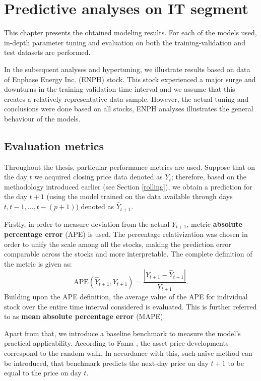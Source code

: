 \chapter{Predictive analyses on IT segment}
\label{chap:3}

This chapter presents the obtained modeling results. For each of the models used, in-depth parameter tuning and evaluation 
on both the training-validation and test datasets are performed. 

In the subsequent analyses and hypertuning, we illustrate results based on data of Enphase Energy Inc. (ENPH) stock. This stock experienced a major surge and downturns in the training-validation time interval
and we assume that this creates a relatively representative data sample. However, the actual tuning and conclusions were done based on all stocks, ENPH analyses illustrates the general behaviour of the models. 

\section{Evaluation metrics} 

Throughout the thesis, particular performance metrics are used. Suppose that on the day $t$
we acquired closing price data denoted as $Y_t$; therefore, based on the methodology introduced earlier (see Section \ref{rolling}),
we obtain a prediction for the day $t+1$ (using the model trained on the data available through days $t, t-1, \ldots, t-(p+1)$) denoted as $\hat{Y}_{t+1}$.

Firstly, in order to measure deviation from the actual $Y_{t+1}$, metric \textbf{absolute percentage error} (APE) is used.
The percentage relativization was chosen in order to unify the scale among all the stocks, making the prediction error comparable
across the stocks and more interpretable. The complete definition of the metric is given as:
\begin{equation*}
    \text{APE}(\hat{Y}_{t+1}, Y_{t+1})=\frac{|Y_{t+1}-\hat{Y}_{t+1}|}{Y_{t+1}}.
\end{equation*}
Building upon the APE definition, the average value of the APE for individual stock over the entire time interval considered is evaluated. This is further referred
to as \textbf{mean absolute percentage error} (MAPE).

Apart from that, we introduce a baseline benchmark to measure the model's practical applicability. According to Fama \cite{fama1970efficient}, the asset price developments correspond to 
the random walk. In accordance with this, such naïve method can be introduced, that benchmark predicts the next-day price on day $t+1$
to be equal to the price on day $t$.

